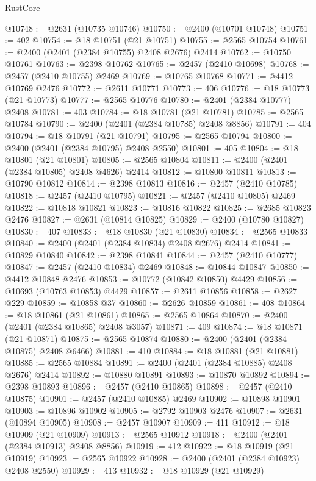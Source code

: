 \begin{lexlean}{RustCore}
\begin{coremodule}
@10748 := @2631 (@10735 @10746)
@10750 := @2400 (@10701 @10748)
@10751 := 402
@10754 := @18 @10751 (@21 @10751)
@10755 := @2565 @10754
@10761 := @2400 (@2401 (@2384 @10755) @2408 @2676) @2414
@10762 := @10750 @10761
@10763 := @2398 @10762
@10765 := @2457 (@2410 @10698)
@10768 := @2457 (@2410 @10755) @2469
@10769 := @10765 @10768
@10771 := @4412 @10769 @2476
@10772 := @2611 @10771
@10773 := 406
@10776 := @18 @10773 (@21 @10773)
@10777 := @2565 @10776
@10780 := @2401 (@2384 @10777) @2408
@10781 := 403
@10784 := @18 @10781 (@21 @10781)
@10785 := @2565 @10784
@10790 := @2400 (@2401 (@2384 @10785) @2408 @8856)
@10791 := 404
@10794 := @18 @10791 (@21 @10791)
@10795 := @2565 @10794
@10800 := @2400 (@2401 (@2384 @10795) @2408 @2550)
@10801 := 405
@10804 := @18 @10801 (@21 @10801)
@10805 := @2565 @10804
@10811 := @2400 (@2401 (@2384 @10805) @2408 @4626) @2414
@10812 := @10800 @10811
@10813 := @10790 @10812
@10814 := @2398 @10813
@10816 := @2457 (@2410 @10785)
@10818 := @2457 (@2410 @10795)
@10821 := @2457 (@2410 @10805) @2469
@10822 := @10818 @10821
@10823 := @10816 @10822
@10825 := @2685 @10823 @2476
@10827 := @2631 (@10814 @10825)
@10829 := @2400 (@10780 @10827)
@10830 := 407
@10833 := @18 @10830 (@21 @10830)
@10834 := @2565 @10833
@10840 := @2400 (@2401 (@2384 @10834) @2408 @2676) @2414
@10841 := @10829 @10840
@10842 := @2398 @10841
@10844 := @2457 (@2410 @10777)
@10847 := @2457 (@2410 @10834) @2469
@10848 := @10844 @10847
@10850 := @4412 @10848 @2476
@10853 := @10772 (@10842 @10850) @4429
@10856 := @10693 (@10763 @10853) @4429
@10857 := @2611 @10856
@10858 := @2627 @229
@10859 := @10858 @37
@10860 := @2626 @10859
@10861 := 408
@10864 := @18 @10861 (@21 @10861)
@10865 := @2565 @10864
@10870 := @2400 (@2401 (@2384 @10865) @2408 @3057)
@10871 := 409
@10874 := @18 @10871 (@21 @10871)
@10875 := @2565 @10874
@10880 := @2400 (@2401 (@2384 @10875) @2408 @6466)
@10881 := 410
@10884 := @18 @10881 (@21 @10881)
@10885 := @2565 @10884
@10891 := @2400 (@2401 (@2384 @10885) @2408 @2676) @2414
@10892 := @10880 @10891
@10893 := @10870 @10892
@10894 := @2398 @10893
@10896 := @2457 (@2410 @10865)
@10898 := @2457 (@2410 @10875)
@10901 := @2457 (@2410 @10885) @2469
@10902 := @10898 @10901
@10903 := @10896 @10902
@10905 := @2792 @10903 @2476
@10907 := @2631 (@10894 @10905)
@10908 := @2457 @10907
@10909 := 411
@10912 := @18 @10909 (@21 @10909)
@10913 := @2565 @10912
@10918 := @2400 (@2401 (@2384 @10913) @2408 @8856)
@10919 := 412
@10922 := @18 @10919 (@21 @10919)
@10923 := @2565 @10922
@10928 := @2400 (@2401 (@2384 @10923) @2408 @2550)
@10929 := 413
@10932 := @18 @10929 (@21 @10929)

\end{coremodule}
\end{lexlean}
